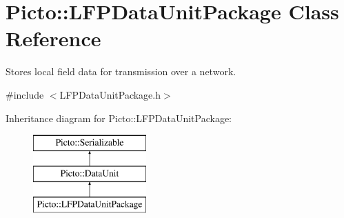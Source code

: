 \hypertarget{class_picto_1_1_l_f_p_data_unit_package}{\section{Picto\-:\-:L\-F\-P\-Data\-Unit\-Package Class Reference}
\label{class_picto_1_1_l_f_p_data_unit_package}
}


Stores local field data for transmission over a network.  




{\ttfamily \#include $<$L\-F\-P\-Data\-Unit\-Package.\-h$>$}

Inheritance diagram for Picto\-:\-:L\-F\-P\-Data\-Unit\-Package\-:\begin{figure}[H]
\begin{center}
\leavevmode
\includegraphics[height=3.000000cm]{class_picto_1_1_l_f_p_data_unit_package}
\end{center}
\end{figure}
